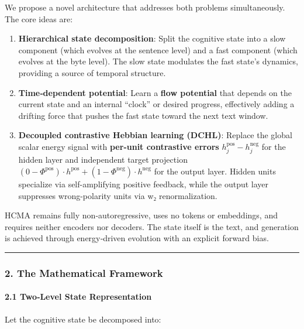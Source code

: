 \documentclass[
  11pt,
  a4paper,
]{article}
\begin{document}
We propose a novel architecture that addresses both problems
simultaneously. The core ideas are:

\begin{enumerate}
\def\labelenumi{\arabic{enumi}.}
\item
  \textbf{Hierarchical state decomposition}: Split the cognitive state
  into a slow component (which evolves at the sentence level) and a fast
  component (which evolves at the byte level). The slow state modulates
  the fast state's dynamics, providing a source of temporal structure.
\item
  \textbf{Time‑dependent potential}: Learn a \textbf{flow potential}
  that depends on the current state and an internal ``clock'' or desired
  progress, effectively adding a drifting force that pushes the fast
  state toward the next text window.
\item
  \textbf{Decoupled contrastive Hebbian learning (DCHL)}: Replace the
  global scalar energy signal with \textbf{per-unit contrastive errors}
  \(h^{\text{pos}}_j - h^{\text{neg}}_j\) for the hidden layer and
  independent target projection
  \((0-\Phi^{\text{pos}}) \cdot h^{\text{pos}} + (1-\Phi^{\text{neg}}) \cdot h^{\text{neg}}\)
  for the output layer. Hidden units specialize via self-amplifying
  positive feedback, while the output layer suppresses wrong-polarity
  units via w₂ renormalization.
\end{enumerate}

HCMA remains fully non‑autoregressive, uses no tokens or embeddings, and
requires neither encoders nor decoders. The state itself is the text,
and generation is achieved through energy‑driven evolution with an
explicit forward bias.

\begin{center}\rule{0.5\linewidth}{0.5pt}\end{center}

\subsubsection{2. The Mathematical
Framework}\label{the-mathematical-framework}

\paragraph{2.1 Two‑Level State
Representation}\label{twolevel-state-representation}

Let the cognitive state be decomposed into:
\end{document}
